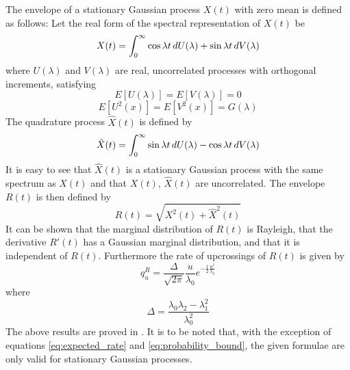 \documentclass{article}
\begin{document}
The envelope of a stationary Gaussian process $X (t)$ with zero mean is
defined as follows: Let the real form of the spectral representation of $X
(t)$ be
\begin{equation}
  \label{eq:real_form_spectral} X (t) = \int_0^{\infty} \cos \lambda t
  \hspace{0.17em} dU (\lambda) + \sin \lambda t \hspace{0.17em} dV (\lambda)
\end{equation}
where $U (\lambda)$ and $V (\lambda)$ are real, uncorrelated processes with
orthogonal increments, satisfying
\begin{equation}
  E [U (\lambda)] = E [V (\lambda)] = 0
\end{equation}
\begin{equation}
  E [U^2 (x)] = E [V^2 (x)] = G (\lambda)
\end{equation}
The quadrature process $\hat{X} (t)$ is defined by
\begin{equation}
  \label{eq:quadrature_process} \hat{X} (t) = \int_0^{\infty} \sin \lambda t
  \hspace{0.17em} dU (\lambda) - \cos \lambda t \hspace{0.17em} dV (\lambda)
\end{equation}
It is easy to see that $\hat{X} (t)$ is a stationary Gaussian process with the
same spectrum as $X (t)$ and that $X (t)$, $\hat{X} (t)$ are uncorrelated. The
envelope $R (t)$ is then defined by
\begin{equation}
  \label{eq:envelope} R (t) = \sqrt{X^2 (t) + \hat{X}^2 (t)}
\end{equation}
It can be shown that the marginal distribution of $R (t)$ is Rayleigh, that
the derivative $R' (t)$ has a Gaussian marginal distribution, and that it is
independent of $R (t)$. Furthermore the rate of upcrossings of $R (t)$ is
given by
\begin{equation}
  \label{eq:rayleigh_rate} q_u^R = \frac{\Delta}{\sqrt{2 \pi}} 
  \frac{u}{\lambda_0} e^{- \frac{1}{2}  \frac{u^2}{\lambda_0}}
\end{equation}
where
\begin{equation}
  \Delta = \frac{\lambda_0 \lambda_2 - \lambda_1^2}{\lambda_0^2}
\end{equation}
The above results are proved in {\cite{cramer1967}}. It is to be noted that,
with the exception of equations \ref{eq:expected_rate} and
\ref{eq:probability_bound}, the given formulae are only valid for stationary
Gaussian processes.
\end{document}
